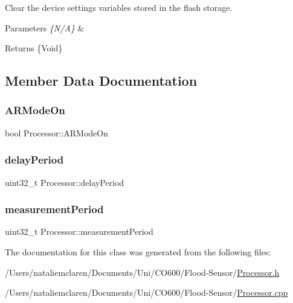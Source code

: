 Clear the device settings variables stored in the flash storage. 
\begin{DoxyParams}{Parameters}
{\em \{\+N/\+A\}} & \\
\hline
\end{DoxyParams}
\begin{DoxyReturn}{Returns}
\{Void\} 
\end{DoxyReturn}


\subsection{Member Data Documentation}
\mbox{\label{class_processor_af51b6b3ce7074068195b5d3eb2442fdb}} 
\subsubsection{\texorpdfstring{A\+R\+Mode\+On}{ARModeOn}}
{\footnotesize\ttfamily bool Processor\+::\+A\+R\+Mode\+On}

\mbox{\label{class_processor_a3d4df57c57607d2ed3ad9f2d4ff3e789}} 
\subsubsection{\texorpdfstring{delay\+Period}{delayPeriod}}
{\footnotesize\ttfamily uint32\+\_\+t Processor\+::delay\+Period}

\mbox{\label{class_processor_acd8bba113bac81f4c5695cba7c9dd146}} 
\subsubsection{\texorpdfstring{measurement\+Period}{measurementPeriod}}
{\footnotesize\ttfamily uint32\+\_\+t Processor\+::measurement\+Period}



The documentation for this class was generated from the following files\+:\begin{DoxyCompactItemize}
\item 
/\+Users/nataliemclaren/\+Documents/\+Uni/\+C\+O600/\+Flood-\/\+Sensor/\mbox{\hyperlink{_processor_8h}{Processor.\+h}}\item 
/\+Users/nataliemclaren/\+Documents/\+Uni/\+C\+O600/\+Flood-\/\+Sensor/\mbox{\hyperlink{_processor_8cpp}{Processor.\+cpp}}\end{DoxyCompactItemize}
